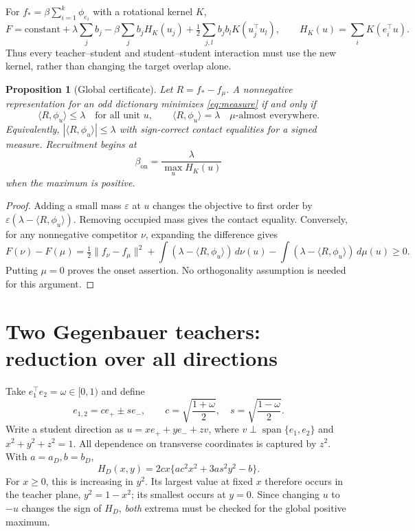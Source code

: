 \documentclass[11pt]{article}
\newcommand{\ip}[2]{\langle #1,#2\rangle}
\newcommand{\norm}[1]{\lVert #1\rVert}
\newcommand{\on}{\mathrm{on}}
\newtheorem{proposition}[theorem]{Proposition}
\theoremstyle{remark}
\begin{document}
For $f_*=\beta\sum_{i=1}^k\phi_{e_i}$ with a rotational kernel $K$,
\begin{equation}\label{eq:Fexpand}
 F=\mathrm{constant}+\lambda\sum_j b_j
 -\beta\sum_jb_j H_K(u_j)
 +\tfrac12\sum_{j,l}b_jb_l K(u_j^\top u_l),
 \qquad H_K(u)=\sum_iK(e_i^\top u).
\end{equation}
Thus every teacher--student and student--student interaction must use the
new kernel, rather than changing the target overlap alone.

\begin{proposition}[Global certificate]\label{prop:certificate}
Let $R=f_*-f_\mu$. A nonnegative representation for an odd dictionary
minimizes \eqref{eq:measure} if and only if
\begin{equation}\label{eq:certificate}
 \ip{R}{\phi_u}\leq\lambda\quad\text{for all unit }u,
 \qquad \ip{R}{\phi_u}=\lambda\quad\mu\text{-almost everywhere}.
\end{equation}
Equivalently, $|\ip{R}{\phi_u}|\leq\lambda$ with sign-correct contact
equalities for a signed measure. Recruitment begins at
\begin{equation}\label{eq:onset}
 \beta_\on=\frac\lambda{\max_u H_K(u)}
\end{equation}
when the maximum is positive.
\end{proposition}
\begin{proof}
Adding a small mass $\varepsilon$ at $u$ changes the objective to first
order by $\varepsilon(\lambda-\ip R{\phi_u})$. Removing occupied mass
gives the contact equality. Conversely, for any nonnegative competitor
$\nu$, expanding the difference gives
\[
 F(\nu)-F(\mu)=\tfrac12\norm{f_\nu-f_\mu}^2
 +\int(\lambda-\ip R{\phi_u})\,d\nu(u)
 -\int(\lambda-\ip R{\phi_u})\,d\mu(u)\geq0.
\]
Putting $\mu=0$ proves the onset assertion. No orthogonality assumption
is needed for this argument.
\end{proof}

\section{Two Gegenbauer teachers: reduction over all directions}

Take $e_1^\top e_2=\omega\in[0,1)$ and define
\begin{equation}
 e_{1,2}=ce_+\pm se_-,\qquad
 c=\sqrt{\frac{1+\omega}{2}},\quad
 s=\sqrt{\frac{1-\omega}{2}}.
\end{equation}
Write a student direction as $u=xe_++ye_-+zv$, where
$v\perp\operatorname{span}\{e_1,e_2\}$ and $x^2+y^2+z^2=1$.
All dependence on transverse coordinates is captured by $z^2$.
With $a=a_D,b=b_D$,
\begin{equation}\label{eq:Hxy}
 H_D(x,y)=2cx\{ac^2x^2+3as^2y^2-b\}.
\end{equation}
For $x\geq0$, this is increasing in $y^2$. Its largest value at fixed
$x$ therefore occurs in the teacher plane, $y^2=1-x^2$; its smallest
occurs at $y=0$. Since changing $u$ to $-u$ changes the sign of $H_D$,
\emph{both} extrema must be checked for the global positive maximum.
\end{document}
